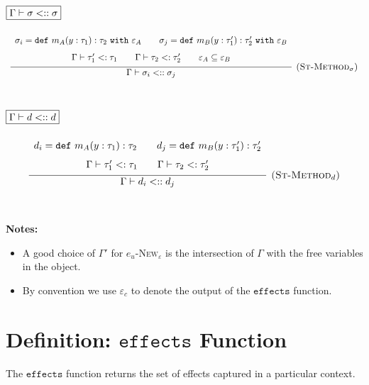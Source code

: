 \documentclass{llncs}
\newcommand{\keywadj}[1]{\mathtt{#1}}
\newcommand{\keyw}[1]{\keywadj{#1}~}
\newcommand{\kw}[1]{\keyw{ #1 }}
\newcommand{\type}[2]{
	#1~\keyw{with} #2
}
\begin{document}
\noindent
$\fbox{$\Gamma \vdash \sigma <:: \sigma$}$

\[
\begin{array}{c}

\infer[\textsc{(St-Method$_\sigma$)}]
	{ \Gamma \vdash \sigma_i <:: \sigma_j }
{{\def\arraystretch{1.6}
  \begin{array}{c}
\sigma_i = \kw{def} m_A(y : \tau_1) : \type{\tau_2}{\varepsilon_A}
~~~~~~\sigma_j = \kw{def} m_B(y : \tau_1') : \type{\tau_2'}{\varepsilon_B} \\
\Gamma \vdash \tau_1' <: \tau_1 ~~~~~~ \Gamma \vdash \tau_2 <: \tau_2' ~~~~~~ \varepsilon_A \subseteq \varepsilon_B
  \end{array}}} \\[5ex]
 
\end{array}
\]



\noindent
$\fbox{$\Gamma \vdash d <:: d$}$

\[
\begin{array}{c}

\infer[\textsc{(St-Method$_d$)}]
	{ \Gamma \vdash d_i <:: d_j }
{{\def\arraystretch{1.6}
  \begin{array}{c}
d_i = \kw{def} m_A(y : \tau_1) : \tau_2 ~~~~~~ d_j = \kw{def} m_B(y : \tau_1') : \tau_2' \\
\Gamma \vdash \tau_1' <: \tau_1 ~~~~~~ \Gamma \vdash \tau_2 <: \tau_2'
  \end{array}}} \\[5ex]

\end{array}
\]

\noindent \textbf{Notes:}
\begin{itemize}
	\item A good choice of $\Gamma'$ for \textsc{$e_u$-New$_\varepsilon$} is the intersection of $\Gamma$ with the free variables in the object.
	\item By convention we use $\varepsilon_c$ to denote the output of the $\keywadj{effects}$ function.
\end{itemize}

\section{Definition: $\keywadj{effects}$ Function}

\noindent
The $\keywadj{effects}$ function returns the set of effects captured in a particular context.
\end{document}

